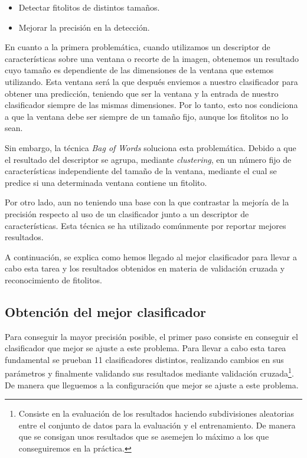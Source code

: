 \begin{itemize}
	\item Detectar fitolitos de distintos tamaños.
	\item Mejorar la precisión en la detección.
\end{itemize}

En cuanto a la primera problemática, cuando utilizamos un descriptor de características sobre una ventana o recorte de la imagen, obtenemos un resultado cuyo tamaño es dependiente de las dimensiones de la ventana que estemos utilizando. Esta ventana será la que después enviemos a nuestro clasificador para obtener una predicción, teniendo que ser la ventana y la entrada de nuestro clasificador siempre de las mismas dimensiones. Por lo tanto, esto nos condiciona a que la ventana debe ser siempre de un tamaño fijo, aunque los fitolitos no lo sean.

Sin embargo, la técnica \textit{Bag of Words} soluciona esta problemática. Debido a que el resultado del descriptor se agrupa, mediante \textit{clustering}, en un número fijo de características independiente del tamaño de la ventana, mediante el cual se predice si una determinada ventana contiene un fitolito.

Por otro lado, aun no teniendo una base con la que contrastar la mejoría de la precisión respecto al uso de un clasificador junto a un descriptor de características. Esta técnica se ha utilizado comúnmente por reportar mejores resultados. 

A continuación, se explica como hemos llegado al mejor clasificador para llevar a cabo esta tarea y los resultados obtenidos en materia de validación cruzada y reconocimiento de fitolitos.

\subsection{Obtención del mejor clasificador}

Para conseguir la mayor precisión posible, el primer paso consiste en conseguir el clasificador que mejor se ajuste a este problema. Para llevar a cabo esta tarea fundamental se prueban 11 clasificadores distintos, realizando cambios en sus parámetros y finalmente validando sus resultados mediante validación cruzada\footnote{Consiste en la evaluación de los resultados haciendo subdivisiones aleatorias entre el conjunto de datos para la evaluación y el entrenamiento. De manera que se consigan unos resultados que se asemejen lo máximo a los que conseguiremos en la práctica.}. De manera que lleguemos a la configuración que mejor se ajuste a este problema.

